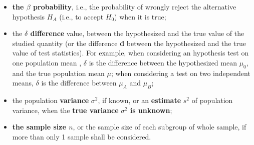 \begin{frame}
  \vspace*{.5cm}
  \begin{itemize}
    \item \textbf{the {\boldmath${\beta}$} probability}, i.e., the probability of wrongly reject the alternative hypothesis $ H_A $ (i.e., to accept $H_0$) when it is true;
    \vspace*{.5cm}
    \item the \textbf{{\boldmath${\delta}$} difference} value, between the hypothesized and the true value of the studied quantity (or the difference \textbf{d} between the hypothesized and the true value of test statistics). For example, when considering an hypothesis test on one population mean , ${\delta}$ is the difference between the hypothesized mean $\mu_0$, and the true population mean $\mu$; when considering a test on two independent means, ${\delta}$ is the difference between $\mu_A$ and $\mu_B$;
  \end{itemize}
\end{frame}

\begin{frame}
  \vspace*{.25cm}
  \begin{itemize}
    \item the population \textbf{variance}{ \boldmath $ \sigma^2 $}, if known, or an \textbf{estimate} {\boldmath $ {s^2} $} of population variance, when the \textbf{true variance} {\boldmath$\sigma^2$} \textbf{is unknown};
    \vspace*{.5cm}
    \item \textbf{the sample size {\boldmath $ n $}}, or the sample size of each subgroup of whole sample, if more than only 1 sample shall be considered.
  \end{itemize}
\end{frame}





